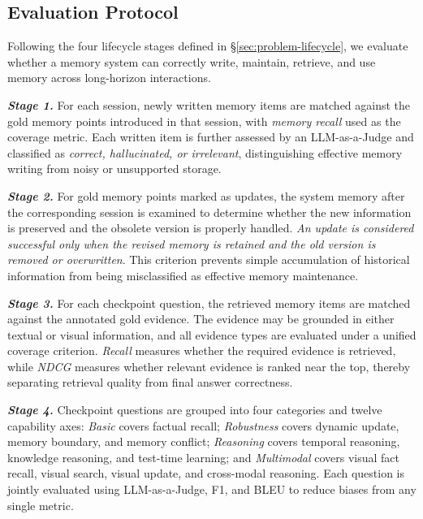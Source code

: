\documentclass{article}
\begin{document}
\subsection{Evaluation Protocol}
Following the four lifecycle stages defined in \S\ref{sec:problem-lifecycle}, we evaluate whether a memory system can correctly write, maintain, retrieve, and use memory across long-horizon interactions. 

\textit{\textbf{Stage 1.}} For each session, newly written memory items are matched against the gold memory points introduced in that session, with \textit{memory recall} used as the coverage metric. Each written item is further assessed by an LLM-as-a-Judge and classified as \textit{correct, hallucinated, or irrelevant}, distinguishing effective memory writing from noisy or unsupported storage.

\textit{\textbf{Stage 2.}} For gold memory points marked as updates, the system memory after the corresponding session is examined to determine whether the new information is preserved and the obsolete version is properly handled. \textit{An update is considered successful only when the revised memory is retained and the old version is removed or overwritten}. This criterion prevents simple accumulation of historical information from being misclassified as effective memory maintenance.

\textit{\textbf{Stage 3.}} For each checkpoint question, the retrieved memory items are matched against the annotated gold evidence. The evidence may be grounded in either textual or visual information, and all evidence types are evaluated under a unified coverage criterion. \textit{Recall} measures whether the required evidence is retrieved, while \textit{NDCG} measures whether relevant evidence is ranked near the top, thereby separating retrieval quality from final answer correctness.

\textit{\textbf{Stage 4.}} Checkpoint questions are grouped into four categories and twelve capability axes: \textit{Basic} covers factual recall; \textit{Robustness} covers dynamic update, memory boundary, and memory conflict; \textit{Reasoning} covers temporal reasoning, knowledge reasoning, and test-time learning; and \textit{Multimodal} covers visual fact recall, visual search, visual update, and cross-modal reasoning. Each question is jointly evaluated using LLM-as-a-Judge, F1, and BLEU to reduce biases from any single metric.

\end{document}
